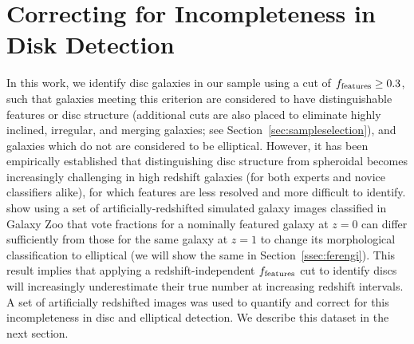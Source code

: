 \documentclass[useAMS,usenatbib]{mn2e}
\begin{document}
\section{Correcting for Incompleteness in Disk Detection}
\label{sec:correction}
In this work, we identify disc galaxies in our sample using a cut of $f_{\rm features}\ge0.3$, such that galaxies meeting this criterion are considered to have distinguishable features or disc structure (additional cuts are also placed to eliminate highly inclined, irregular, and merging galaxies; see Section~\ref{sec:sampleselection}), and galaxies which do not are considered to be elliptical. However, it has been empirically established that distinguishing disc structure from spheroidal becomes increasingly challenging in high redshift galaxies (for both experts and novice classifiers alike), for which features are less resolved and more difficult to identify. \citet{Willett2016} show using a set of artificially-redshifted simulated galaxy images classified in Galaxy Zoo that vote fractions for a nominally featured galaxy at $z=0$ can differ sufficiently from those for the same galaxy at $z=1$ to change its morphological classification to elliptical (we will show the same in Section~\ref{ssec:ferengi}).  This result implies that applying a redshift-independent $f_{\rm features}$ cut to identify discs will increasingly underestimate their true number at increasing redshift intervals. A set of artificially redshifted images was used to quantify and correct for this incompleteness in disc and elliptical detection. We describe this dataset in the next section.
 
\end{document}
